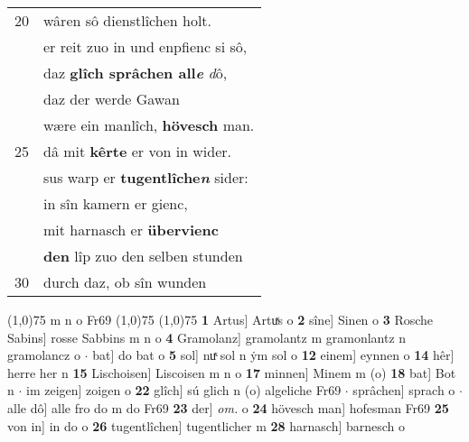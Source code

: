 \documentclass[8pt,a4paper,notitlepage]{article}
\begin{document}
\begin{table}[ht]
\begin{minipage}[t]{0.5\linewidth}
\begin{tabular}{rl}
20 & wâren sô dienstlîchen holt.\\ 
 & er reit zuo in und enpfienc si sô,\\ 
 & daz \textbf{glîch sprâchen all\textit{e}} \textit{d}ô,\\ 
 & daz der werde Gawan\\ 
 & wære ein manlîch, \textbf{hövesch} man.\\ 
25 & dâ mit \textbf{kêrte} er von in wider.\\ 
 & sus warp er \textbf{tugentlîche\textit{n}} sider:\\ 
 & in sîn kamern er gienc,\\ 
 & mit harnasch er \textbf{übervienc}\\ 
 & \textbf{den} lîp zuo den selben stunden\\ 
30 & durch daz, ob sîn wunden\\ 
\end{tabular}
\scriptsize
\line(1,0){75} \newline
m n o Fr69 \newline
\line(1,0){75} \newline
\newline
\line(1,0){75} \newline
\textbf{1} Artus] Artuͯs o \textbf{2} sîne] Sinen o \textbf{3} Rosche Sabins] rosse Sabbins m n o \textbf{4} Gramolanz] gramolantz m gramonlantz n gramolancz o  $\cdot$ bat] do bat o \textbf{5} sol] nuͯ sol n ẏm sol o \textbf{12} einem] eynnen o \textbf{14} hêr] herre her n \textbf{15} Lischoisen] Liscoisen m n o \textbf{17} minnen] Minem m (o) \textbf{18} bat] Bot n  $\cdot$ im zeigen] zoigen o \textbf{22} glîch] sú glich n (o) algeliche Fr69  $\cdot$ sprâchen] sprach o  $\cdot$ alle dô] alle fro do m do Fr69 \textbf{23} der] \textit{om.} o \textbf{24} hövesch man] hofesman Fr69 \textbf{25} von in] in do o \textbf{26} tugentlîchen] tugentlicher m \textbf{28} harnasch] barnesch o \newline
\end{minipage}
\end{table}
\newpage
\end{document}
